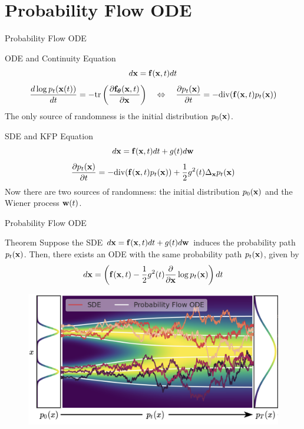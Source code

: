 \documentclass{beamer}
\begin{document}
\section{Probability Flow ODE}
\begin{frame}{Probability Flow ODE}
	\begin{block}{ODE and Continuity Equation}
		\vspace{-0.3cm}
		\[
			d\mathbf{x} = \mathbf{f}(\mathbf{x}, t) dt
		\]
		\[
			\frac{d \log p_t(\mathbf{x}(t))}{d t} = - \text{tr} \left( \frac{\partial \mathbf{f}_{\boldsymbol{\theta}}(\mathbf{x}, t)}{\partial \mathbf{x}} \right) 
			\quad  \Leftrightarrow  \quad 
 			\frac{\partial p_t(\mathbf{x})}{\partial t} = - \text{div}(\mathbf{f}(\mathbf{x}, t) p_t(\mathbf{x}))
 		\]
		The only source of randomness is the initial distribution $p_0(\mathbf{x})$.
	\end{block}
	\eqpause
	\begin{block}{SDE and KFP Equation}
		\vspace{-0.3cm}
		\[
			d\mathbf{x} = \mathbf{f}(\mathbf{x}, t) dt + g(t) d \mathbf{w}
		\]
 		\[
 			\frac{\partial p_t(\mathbf{x})}{\partial t} = - \text{div}(\mathbf{f}(\mathbf{x}, t) p_t(\mathbf{x})) + \frac{1}{2}g^2(t) \Delta_{\mathbf{x}}p_t(\mathbf{x})
 		\]
		Now there are two sources of randomness: the initial distribution $p_0(\mathbf{x})$ and the Wiener process $\mathbf{w}(t)$.
	\end{block}
\end{frame}
\begin{frame}{Probability Flow ODE}
	\begin{block}{Theorem}
		Suppose the SDE $d\mathbf{x} = \mathbf{f}(\mathbf{x}, t) dt + g(t) d \mathbf{w}$ induces the probability path $p_t(\mathbf{x})$.
		Then, there exists an ODE with the same probability path $p_t(\mathbf{x})$, given by
		\vspace{-0.3cm}
		\[
			d\mathbf{x} = \left(\mathbf{f}(\mathbf{x}, t) -\frac{1}{2} g^2(t) \frac{\partial}{\partial \mathbf{x}} \log p_t(\mathbf{x}) \right) dt
		\]
		\vspace{-0.7cm}
	\end{block}
	\eqpause
	\begin{figure}
		\includegraphics[width=0.75\linewidth]{figs/probability_flow}
	\end{figure}
\end{frame}
\end{document}
